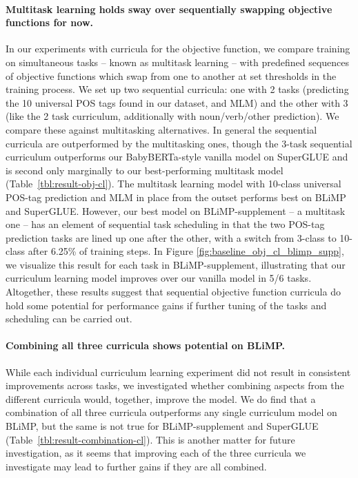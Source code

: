 \paragraph{Multitask learning holds sway over sequentially swapping objective functions for now.}
In our experiments with curricula for the objective function, we compare training on simultaneous tasks -- known as multitask learning \cite{caruana1997multitask} -- with predefined sequences of objective functions which swap from one to another at set thresholds in the training process. We set up two sequential curricula: one with 2 tasks (predicting the 10 universal POS tags found in our dataset, and MLM) and the other with 3 (like the 2 task curriculum, additionally with noun/verb/other prediction). We compare these against multitasking alternatives. In general the sequential curricula are outperformed by the multitasking ones, though the 3-task sequential curriculum outperforms our BabyBERTa-style vanilla model on SuperGLUE and is second only marginally to our best-performing multitask model (Table~\ref{tbl:result-obj-cl}). The multitask learning model with 10-class universal POS-tag prediction and MLM in place from the outset performs best on BLiMP and SuperGLUE. However, our best model on BLiMP-supplement -- a multitask one -- has an element of sequential task scheduling in that the two POS-tag prediction tasks are lined up one after the other, with a switch from 3-class to 10-class after 6.25\% of training steps. In Figure \ref{fig:baseline_obj_cl_blimp_supp}, we visualize this result for each task in BLiMP-supplement, illustrating that our curriculum learning model improves over our vanilla model in 5/6 tasks.
Altogether, these results suggest that sequential objective function curricula do hold some potential for performance gains if further tuning of the tasks and scheduling can be carried out.

\paragraph{Combining all three curricula shows potential on BLiMP.}
While each individual curriculum learning experiment did not result in consistent improvements across tasks, we investigated whether combining aspects from the different curricula would, together, improve the model.
We do find that a combination of all three curricula outperforms any single curriculum model on BLiMP, but the same is not true for BLiMP-supplement and SuperGLUE (Table~\ref{tbl:result-combination-cl}). This is another matter for future investigation, as it seems that improving each of the three curricula we investigate may lead to further gains if they are all combined.


